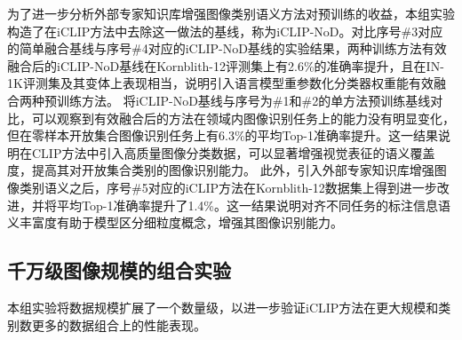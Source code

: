 为了进一步分析外部专家知识库增强图像类别语义方法对预训练的收益，本组实验构造了在iCLIP方法中去除这一做法的基线，称为iCLIP-NoD。对比序号\#3对应的简单融合基线与序号\#4对应的iCLIP-NoD基线的实验结果，两种训练方法有效融合后的iCLIP-NoD基线在Kornblith-12评测集上有2.6\%的准确率提升，且在IN-1K评测集及其变体上表现相当，说明引入语言模型重参数化分类器权重能有效融合两种预训练方法。
将iCLIP-NoD基线与序号为\#1和\#2的单方法预训练基线对比，可以观察到有效融合后的方法在领域内图像识别任务上的能力没有明显变化，但在零样本开放集合图像识别任务上有6.3\%的平均Top-1准确率提升。这一结果说明在CLIP方法中引入高质量图像分类数据，可以显著增强视觉表征的语义覆盖度，提高其对开放集合类别的图像识别能力。
此外，引入外部专家知识库增强图像类别语义之后，序号\#5对应的iCLIP方法在Kornblith-12数据集上得到进一步改进，并将平均Top-1准确率提升了1.4\%。这一结果说明对齐不同任务的标注信息语义丰富度有助于模型区分细粒度概念，增强其图像识别能力。


\subsection{千万级图像规模的组合实验}
本组实验将数据规模扩展了一个数量级，以进一步验证iCLIP方法在更大规模和类别数更多的数据组合上的性能表现。

